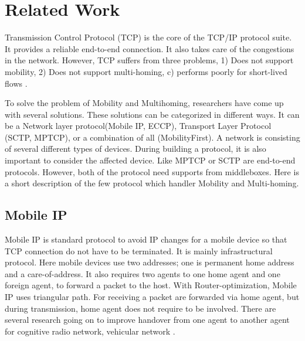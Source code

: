 \section{Related Work}
%
Transmission Control Protocol (TCP) is the core of the TCP/IP protocol suite. It provides a reliable end-to-end connection. It also takes care of the congestions in the network. However, TCP suffers from three problems, 1) Does not support mobility, 2) Does not support multi-homing, c) performs poorly for short-lived flows \cite{de2016throughput,islam2016start}.

To solve the problem of Mobility and Multihoming, researchers have come up with several solutions. These solutions can be categorized in different ways. It can be a Network layer protocol(Mobile IP, ECCP), Transport Layer Protocol (SCTP, MPTCP), or a combination of all (MobilityFirst). A network is consisting of several different types of devices. During building a protocol, it is also important to consider the affected device. Like MPTCP or SCTP are end-to-end protocols. However, both of the protocol need supports from middleboxes. Here is a short description of the few protocol which handler Mobility and Multi-homing.


\subsection{Mobile IP}
Mobile IP\cite{MobileIp} is standard protocol to avoid IP changes for a mobile device so that TCP connection do not have to be terminated. It is mainly infrastructural protocol. Here mobile devices use two addresses; one is permanent home address and a care-of-address. It also requires two agents to one home agent and one foreign agent, to forward a packet to the host. With Router-optimization, Mobile IP uses triangular path. For receiving a packet are forwarded via home agent, but during transmission, home agent does not require to be involved. There are several research going on to improve handover from one agent to another agent for cognitive radio network\cite{MobileIpCognitive}, vehicular network\cite{MobileIpVehicular2015,MobileIpVehicular2016} \cite{MobileIpHandover}.

